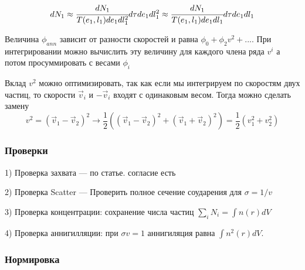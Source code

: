 	\begin{equation}
		dN_1 \approx \cfrac{dN_1}{T(e_1,l_1)de_1 dl_1^2} d\tau de_1 dl_1^2 \approx \cfrac{dN_1}{T(e_1,l_1)de_1 dl_1} d\tau de_1 dl_1 
	\end{equation}
	
	Величина $\phi_{ann}$ зависит от разности скоростей и равна $\phi_0 + \phi_2 v^2 +...$. При интегрировании можно вычислить эту величину для каждого члена ряда $v^i$ а потом просуммировать с весами $\phi_i$
	
	Вклад $v^2$ можно оптимизировать, так как если мы интегрируем по скоростям двух частиц, то скорости $\vec{v}_i$ и $-\vec{v}_i$ входят с одинаковым весом. Тогда можно сделать замену
	\begin{equation}
		v^2 = (\vec{v}_1-\vec{v}_2)^2 \rightarrow \frac{1}{2}\left(
			(\vec{v}_1-\vec{v}_2)^2 + 
			(\vec{v}_1+\vec{v}_2)^2
		\right) = \frac{1}{2}(v_1^2+v_2^2)
	\end{equation}
	
	\subsubsection{Проверки}
	1) Проверка захвата --- по статье. согласие есть
	
	2) Проверка Scatter --- Проверить полное сечение соударения для $\sigma = 1/v$
	
	3) Проверка концентрации: сохранение числа частиц $\sum_i{N_i} = \int{n(r)dV}$
	
	4) Проверка аннигилляции: при $\sigma v = 1$ аннигиляция равна $\int{n^2(r)dV}$.
	
	
	\subsubsection{Нормировка}
	
